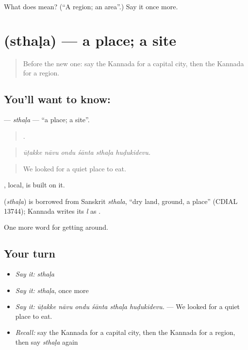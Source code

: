 \begin{tcolorbox}[breakable,colback=teal!4,colframe=teal!35!black,title={Before you move on}]
What does  mean? (\textquotedblleft{}A region; an area\textquotedblright{}.) Say it once more.
\end{tcolorbox}
\section[\texorpdfstring{\kn{ಸ್ಥಳ} (sthaḷa)}{ಸ್ಥಳ (sthaḷa)}]{ (sthaḷa) — a place; a site}

\label{lesson:KA-C465-sthala}



\begin{quote}
Before the new one: say the Kannada for a capital city, then the Kannada for a region.
\end{quote}

\subsection*{You'll want to know: }
\textbf{} — \emph{sthaḷa} — \textquotedblleft{}a place; a site\textquotedblright{}.

\begin{quote}
     .
\end{quote}

\begin{quote}
\emph{ūṭakke nāvu ondu śānta sthaḷa huḍukidevu.}
\end{quote}

\begin{quote}
We looked for a quiet place to eat.
\end{quote}

, local, is built on it.

\begin{cousinweb}
\textbf{} (\emph{sthaḷa}) is borrowed from Sanskrit \emph{sthala}, \textquotedblleft{}dry land, ground, a place\textquotedblright{} (CDIAL 13744); Kannada writes its \emph{l} as .
\end{cousinweb}

\begin{grammarlens}[title={What you've built}]
One more word for getting around.
\end{grammarlens}

\subsection*{Your turn}
\begin{itemize}
\raggedright
  \item \emph{Say it:} \emph{sthaḷa}
  \item \emph{Say it:} \emph{sthaḷa}, once more
  \item \emph{Say it:} \emph{ūṭakke nāvu ondu śānta sthaḷa huḍukidevu.} — We looked for a quiet place to eat.
  \item \emph{Recall:} say the Kannada for a capital city, then the Kannada for a region, then say \emph{sthaḷa} again
\end{itemize}

